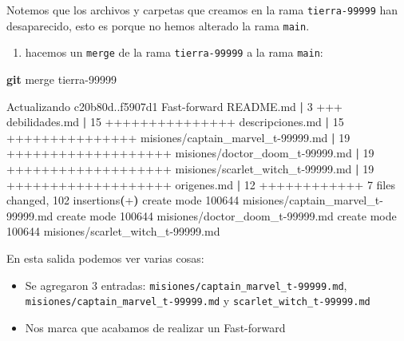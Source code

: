 \documentclass[
]{book}
\newenvironment{Shaded}{\begin{snugshade}}{\end{snugshade}}
\newcommand{\ErrorTok}[1]{\textcolor[rgb]{0.64,0.00,0.00}{\textbf{#1}}}
\newcommand{\ExtensionTok}[1]{#1}
\newcommand{\FunctionTok}[1]{\textcolor[rgb]{0.13,0.29,0.53}{\textbf{#1}}}
\newcommand{\KeywordTok}[1]{\textcolor[rgb]{0.13,0.29,0.53}{\textbf{#1}}}
\newcommand{\NormalTok}[1]{#1}
\providecommand{\tightlist}{%
  \setlength{\itemsep}{0pt}\setlength{\parskip}{0pt}}
\begin{document}
Notemos que los archivos y carpetas que creamos en la rama \texttt{tierra-99999} han desaparecido, esto es porque no hemos alterado la rama \texttt{main}.

\begin{enumerate}
\def\labelenumi{\arabic{enumi}.}
\setcounter{enumi}{9}
\tightlist
\item
  hacemos un \texttt{merge} de la rama \texttt{tierra-99999} a la rama \texttt{main}:
\end{enumerate}

\begin{Shaded}
\begin{Highlighting}[]
\FunctionTok{git}\NormalTok{ merge tierra{-}99999}
\end{Highlighting}
\end{Shaded}

\begin{Shaded}
\begin{Highlighting}[]
\ExtensionTok{Actualizando}\NormalTok{ c20b80d..f5907d1}
\ExtensionTok{Fast{-}forward}
 \ExtensionTok{README.md}                          \KeywordTok{|}  \ExtensionTok{3}\NormalTok{ +++}
 \ExtensionTok{debilidades.md}                     \KeywordTok{|} \ExtensionTok{15}\NormalTok{ +++++++++++++++}
 \ExtensionTok{descripciones.md}                   \KeywordTok{|} \ExtensionTok{15}\NormalTok{ +++++++++++++++}
 \ExtensionTok{misiones/captain\_marvel\_t{-}99999.md} \KeywordTok{|} \ExtensionTok{19}\NormalTok{ +++++++++++++++++++}
 \ExtensionTok{misiones/doctor\_doom\_t{-}99999.md}    \KeywordTok{|} \ExtensionTok{19}\NormalTok{ +++++++++++++++++++}
 \ExtensionTok{misiones/scarlet\_witch\_t{-}99999.md}  \KeywordTok{|} \ExtensionTok{19}\NormalTok{ +++++++++++++++++++}
 \ExtensionTok{origenes.md}                        \KeywordTok{|} \ExtensionTok{12}\NormalTok{ ++++++++++++}
 \ExtensionTok{7}\NormalTok{ files changed, 102 insertions}\ErrorTok{(}\ExtensionTok{+}\KeywordTok{)}
 \ExtensionTok{create}\NormalTok{ mode 100644 misiones/captain\_marvel\_t{-}99999.md}
 \ExtensionTok{create}\NormalTok{ mode 100644 misiones/doctor\_doom\_t{-}99999.md}
 \ExtensionTok{create}\NormalTok{ mode 100644 misiones/scarlet\_witch\_t{-}99999.md}
\end{Highlighting}
\end{Shaded}

En esta salida podemos ver varias cosas:

\begin{itemize}
\tightlist
\item
  Se agregaron 3 entradas: \texttt{misiones/captain\_marvel\_t-99999.md}, \texttt{misiones/captain\_marvel\_t-99999.md} y \texttt{scarlet\_witch\_t-99999.md}
\item
  Nos marca que acabamos de realizar un Fast-forward
\end{itemize}
\end{document}
